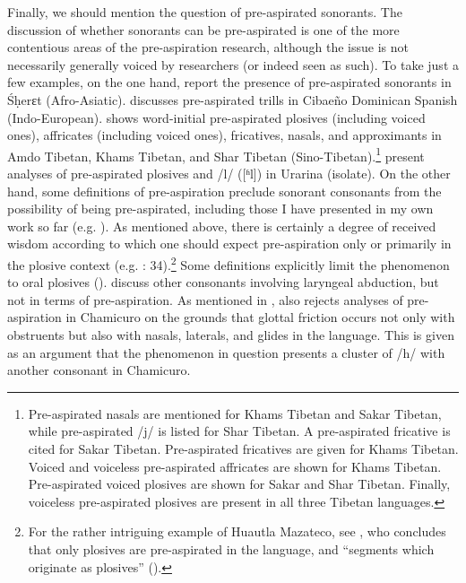 \documentclass[output=paper]{langscibook}
\begin{document}
Finally, we should mention the question of pre-aspirated sonorants. The discussion of whether sonorants can be pre-aspirated is one of the more contentious areas of the pre\hyp aspiration research, although the issue is not necessarily generally voiced by researchers (or indeed seen as such). To take just a few examples, on the one hand,  report the presence of pre-aspirated sonorants in Śḥerɛt (Afro-Asiatic). \citet{Willis2007} discusses pre-aspirated trills in Cibaeño Dominican Spanish (Indo-European). \citet{Suzuki2011} shows word-initial pre-aspirated plosives (including voiced ones), affricates (including voiced ones), fricatives, nasals, and approximants in Amdo Tibetan, Khams Tibetan, and Shar Tibetan (Sino-Tibetan).\footnote{Pre-aspirated nasals are mentioned for Khams Tibetan and Sakar Tibetan, while pre-aspirated /j/ is listed for Shar Tibetan. A pre-aspirated fricative is cited for Sakar Tibetan. Pre-aspirated fricatives are given for Khams Tibetan. Voiced and voiceless pre-aspirated affricates are shown for Khams Tibetan. Pre-aspirated voiced plosives are shown for Sakar and Shar Tibetan. Finally, voiceless pre-aspirated plosives are present in all three Tibetan languages.} \citet{Elias-UlloaAramburú2021} present analyses of pre-aspirated plosives and /l/ ([ʱl]) in Urarina (isolate). On the other hand, some definitions of pre\hyp aspiration preclude sonorant consonants from the possibility of being pre-aspirated, including those I have presented in my own work so far (e.g. \citealt{Hejná2021, HejnáEtAl2021}). As mentioned above, there is certainly a degree of received wisdom according to which one should expect pre\hyp aspiration only or primarily in the plosive context (e.g. \citealt{Willis2007}: 34).\footnote{For the rather intriguing example of Huautla Mazateco, see \citet[230--234]{Steriade1994}, who concludes that only plosives are pre-aspirated in the language, and “segments which originate as plosives” (\citeyear[232]{Steriade1994}).} Some definitions explicitly limit the phenomenon to oral plosives (\cites[70]{LadefogedMaddieson1996}[150]{Laver1994}). \citet[70]{LadefogedMaddieson1996} discuss other consonants involving laryngeal abduction, but not in terms of pre-aspiration. As mentioned in , \citet[61]{Clayton2010} also rejects analyses of pre\hyp aspiration in Chamicuro on the grounds that glottal friction occurs not only with obstruents but also with nasals, laterals, and glides in the language. This is given as an argument that the phenomenon in question presents a cluster of /h/ with another consonant in Chamicuro.
\end{document}
